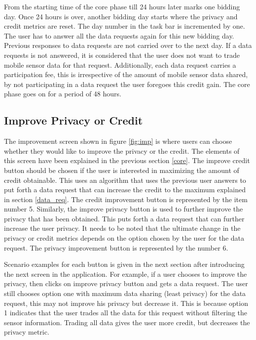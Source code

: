 From the starting time of the core phase till 24 hours later marks one bidding day. Once 24 hours is over, another bidding day starts where the privacy and credit metrics are reset. The day number in the task bar is incremented by one. The user has to answer all the data requests again for this new bidding day. Previous responses to data requests are not carried over to the next day. If a data requests is not answered, it is considered that the user does not want to trade mobile sensor data for that request. Additionally, each data request carries a participation fee, this is irrespective of the amount of mobile sensor data shared, by not participating in a data request the user foregoes this credit gain.
The core phase goes on for a period of 48 hours. 

\subsection{Improve Privacy or Credit}

The improvement screen shown in figure \ref{fig:imp} is where users can choose whether they would like to improve the privacy or the credit. The elements of this screen have been explained in the previous section \ref{core}.
The improve credit button
should be chosen if the user is interested in maximizing the amount of credit obtainable. This uses an algorithm that uses the previous user answers to
put forth a data request that can increase the credit to the maximum explained in section \ref{data_req}. The credit improvement button is represented by the item number 5. Similarly, the improve privacy button is used to further improve the privacy that has been obtained. This puts forth a data request that can further increase the user privacy. It needs to be noted that the ultimate change in the privacy or credit metrics depends on the option chosen by the user for the data request. The privacy improvement button is represented by the number 6.

Scenario examples for each button is given in the next section after introducing the next screen in the application. For example, if a user chooses to improve the privacy, then clicks on improve privacy button and gets a data request. The user still chooses option one with maximum data sharing (least privacy) for the data request, this may not improve his privacy but decrease it. This is because option 1 indicates that the user trades all the data for this request without filtering the sensor information. Trading all data gives the user more credit, but decreases the privacy metric.


